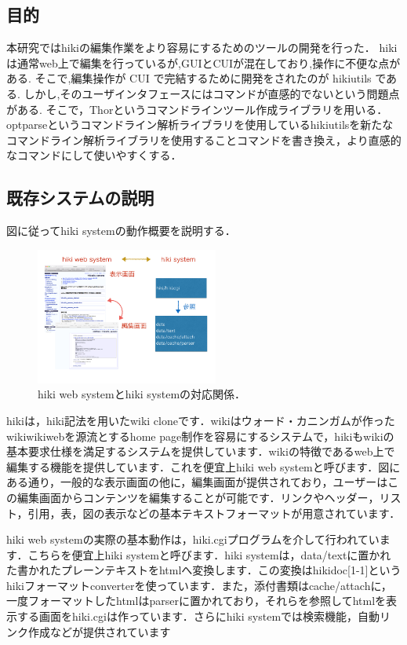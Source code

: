 \subsection{目的}
本研究ではhikiの編集作業をより容易にするためのツールの開発を行った． 
hikiは通常web上で編集を行っているが,GUIとCUIが混在しており,操作に不便な点がある. 
そこで,編集操作が CUI で完結するために開発をされたのが hikiutils である. 
しかし,そのユーザインタフェースにはコマンドが直感的でないという問題点がある. 
そこで，Thorというコマンドラインツール作成ライブラリを用いる．
optparseというコマンドライン解析ライブラリを使用しているhikiutilsを新たなコマンドライン解析ライブラリを使用することコマンドを書き換え，より直感的なコマンドにして使いやすくする．

\subsection{既存システムの説明}
図に従ってhiki systemの動作概要を説明する．

\begin{figure}[htbp]\begin{center}
\includegraphics[width=6cm,bb=0 0 442 500]{../figs/./hikiutils_yamane_09_copy.001.jpg}
\caption{hiki web systemとhiki systemの対応関係．}
\label{default}\end{center}\end{figure}
hikiは，hiki記法を用いたwiki cloneです．wikiはウォード・カニンガムが作ったwikiwikiwebを源流とするhome page制作を容易にするシステムで，hikiもwikiの基本要求仕様を満足するシステムを提供しています．wikiの特徴であるweb上で編集する機能を提供しています．これを便宜上hiki web systemと呼びます．図にある通り，一般的な表示画面の他に，編集画面が提供されており，ユーザーはこの編集画面からコンテンツを編集することが可能です．リンクやヘッダー，リスト，引用，表，図の表示などの基本テキストフォーマットが用意されています．

hiki web systemの実際の基本動作は，hiki.cgiプログラムを介して行われています．こちらを便宜上hiki systemと呼びます．hiki systemは，data/textに置かれた書かれたプレーンテキストをhtmlへ変換します．この変換はhikidoc[1-1]というhikiフォーマットconverterを使っています．また，添付書類はcache/attachに，一度フォーマットしたhtmlはparserに置かれており，それらを参照してhtmlを表示する画面をhiki.cgiは作っています．さらにhiki systemでは検索機能，自動リンク作成などが提供されています

